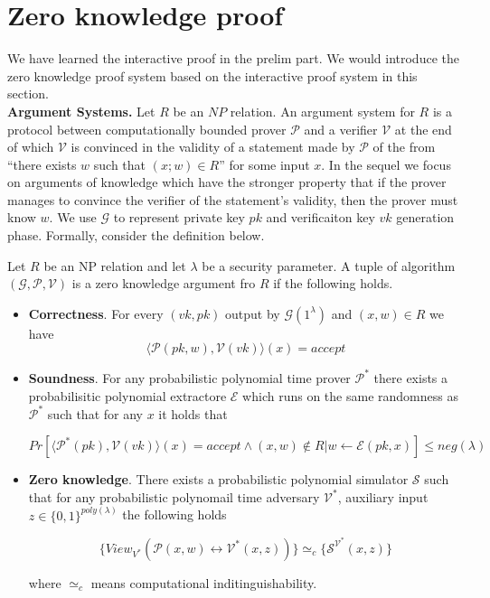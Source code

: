 
\section{Zero knowledge proof}

We have learned the interactive proof in the prelim part. We would introduce the zero knowledge proof system based on the interactive proof system in this section.\\

\noindent
\textbf{Argument Systems.} Let $R$ be an $NP$ relation. An argument system for $R$ is a protocol between
computationally bounded prover $\mathcal{P}$ and a verifier $\mathcal{V}$ at the end of which $\mathcal{V}$ is convinced in the validity of a statement made by $\mathcal{P}$ of the from “there exists $w$ such that $(x; w) \in R$” for some input $x$. In the sequel we focus on arguments of knowledge which have the stronger property that if the prover manages to convince
the verifier of the statement’s validity, then the prover must know $w$. We use $\mathcal{G}$ to represent private key $pk$ and verificaiton key $vk$ generation phase. Formally, consider the definition below.

\begin{definition}\label{def::zkpd}

Let $R$ be an NP relation and let $\lambda$ be a security parameter. A tuple of algorithm $(\mathcal{G}, \mathcal{P}, \mathcal{V})$ is a zero knowledge argument fro $R$ if the following holds.

\begin{itemize}

\item \textbf{Correctness}. For every $(vk, pk)$ output by $\mathcal{G}(1^\lambda)$ and $(x, w) \in R$ we have
$$\langle \mathcal{P}(pk, w), \mathcal{V}(vk) \rangle(x) = accept$$

\item \textbf{Soundness}. For any probabilistic polynomial time prover $\mathcal{P^*}$ there exists a probabilisitic polynomial extractore $\mathcal{E}$ which runs on the same randomness as $\mathcal{P^*}$ such that for any $x$ it holds that

$$Pr[\langle\mathcal{P^*}(pk), \mathcal{V}(vk) \rangle(x) = accept \wedge (x, w) \notin R | w \leftarrow \mathcal{E}(pk, x)] \leq neg(\lambda)$$

\item \textbf{Zero knowledge}. There exists a probabilistic polynomial simulator $\mathcal{S}$ such that for any probabilistic polynomail time adversary $\mathcal{V^*}$, auxiliary input $z \in \{0, 1\}^{poly(\lambda)}$ the following holds

$$\{View_{V^*}(\mathcal{P}(x, w) \leftrightarrow \mathcal{V^*}(x, z))\} \simeq_{c} \{\mathcal{S}^{\mathcal{V^*}}(x, z)\}$$

where $\simeq_{c}$ means computational inditinguishability. 

\end{itemize}

\end{definition}